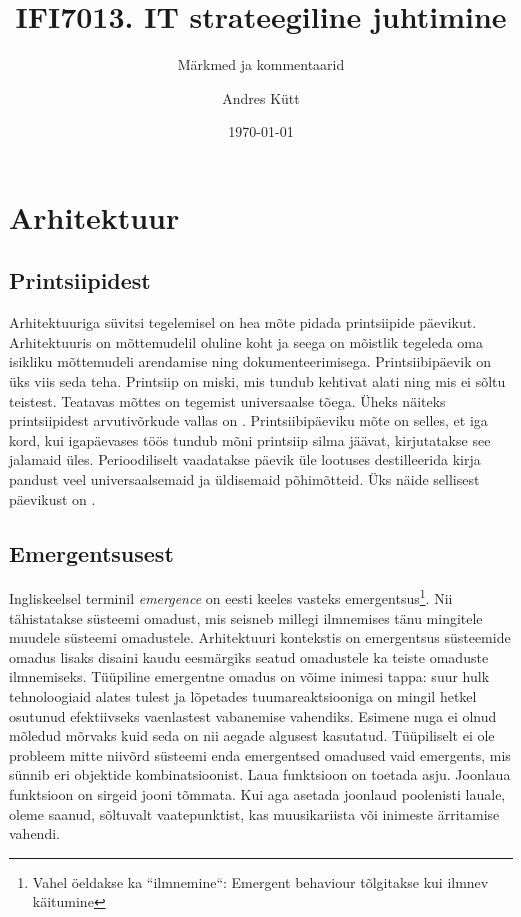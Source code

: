 \documentclass{article}
\title{IFI7013. IT strateegiline juhtimine}
\subtitle{Märkmed ja kommentaarid}
\date{\today}
\author{Andres Kütt}
\begin{document}
\maketitle
\clearpage
\tableofcontents
\clearpage


\section{Arhitektuur}
\subsection{Printsiipidest}
Arhitektuuriga süvitsi tegelemisel on hea mõte pidada printsiipide päevikut. Arhitektuuris on mõttemudelil oluline koht ja seega on mõistlik tegeleda oma isikliku mõttemudeli arendamise ning dokumenteerimisega. Printsiibipäevik on üks viis seda teha. Printsiip on miski, mis tundub kehtivat alati ning mis ei sõltu teistest. Teatavas mõttes on tegemist universaalse tõega. Üheks näiteks printsiipidest arvutivõrkude vallas on \cite{callon1996rfc}. Printsiibipäeviku mõte on selles, et iga kord, kui igapäevases töös tundub mõni printsiip silma jäävat, kirjutatakse see jalamaid üles. Perioodiliselt vaadatakse päevik üle lootuses destilleerida kirja pandust veel universaalsemaid ja üldisemaid põhimõtteid. Üks näide sellisest päevikust on \cite{archprinciples}. 

\subsection{Emergentsusest}
Ingliskeelsel terminil \emph{emergence} on eesti keeles vasteks emergentsus\footnote{Vahel öeldakse ka ``ilmnemine``: Emergent behaviour tõlgitakse kui ilmnev käitumine}. Nii tähistatakse süsteemi omadust, mis seisneb millegi ilmnemises tänu mingitele muudele süsteemi omadustele. Arhitektuuri kontekstis on emergentsus süsteemide omadus lisaks disaini kaudu eesmärgiks seatud omadustele ka teiste omaduste ilmnemiseks. Tüüpiline emergentne omadus on võime inimesi tappa: suur hulk tehnoloogiaid alates tulest ja lõpetades tuumareaktsiooniga on mingil hetkel osutunud efektiivseks vaenlastest vabanemise vahendiks. Esimene nuga ei olnud mõledud mõrvaks kuid seda on nii aegade algusest kasutatud. Tüüpiliselt ei ole probleem mitte niivõrd süsteemi enda emergentsed omadused vaid emergents, mis sünnib eri objektide kombinatsioonist. Laua funktsioon on toetada asju. Joonlaua funktsioon on sirgeid jooni tõmmata. Kui aga asetada joonlaud poolenisti lauale, oleme saanud, sõltuvalt vaatepunktist, kas muusikariista või inimeste ärritamise vahendi. 
\end{document}
